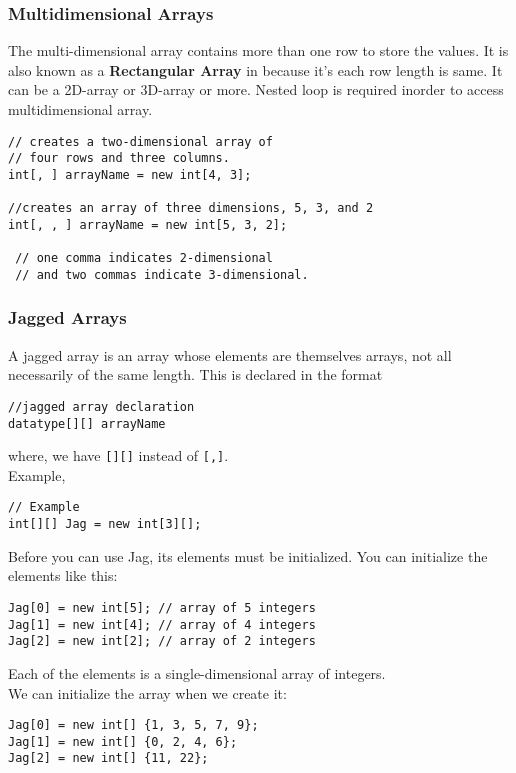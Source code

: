 \subsubsection*{Multidimensional Arrays}
The multi-dimensional array contains more than one row to store the values. It is also known as a \textbf{Rectangular Array} in {\cs} because it’s each row length is same. It can be a 2D-array or 3D-array or more. Nested loop is required inorder to access multidimensional array.
\begin{lstlisting}[numbers=none]
// creates a two-dimensional array of
// four rows and three columns.
int[, ] arrayName = new int[4, 3];

//creates an array of three dimensions, 5, 3, and 2
int[, , ] arrayName = new int[5, 3, 2];

 // one comma indicates 2-dimensional
 // and two commas indicate 3-dimensional.
\end{lstlisting}


\subsubsection*{Jagged Arrays}
A jagged array is an array whose elements are themselves arrays, not all necessarily of the same length. This is declared in the format

\begin{lstlisting}[numbers=none]
//jagged array declaration
datatype[][] arrayName
\end{lstlisting}
\noindent where, we have \verb|[][]| instead of \verb|[,]|.\\

\noindent Example,

\begin{lstlisting}[numbers=none]
// Example
int[][] Jag = new int[3][];
\end{lstlisting}

 \noindent \break Before you can use Jag, its elements must be initialized. You can initialize the elements like this:
\begin{lstlisting}[numbers=none]
Jag[0] = new int[5]; // array of 5 integers
Jag[1] = new int[4]; // array of 4 integers
Jag[2] = new int[2]; // array of 2 integers
\end{lstlisting}

\noindent \break Each of the elements is a single-dimensional array of integers.\\

\noindent We can initialize the array when we create it:
\begin{lstlisting}[numbers=none]
Jag[0] = new int[] {1, 3, 5, 7, 9};
Jag[1] = new int[] {0, 2, 4, 6};
Jag[2] = new int[] {11, 22};
\end{lstlisting}

